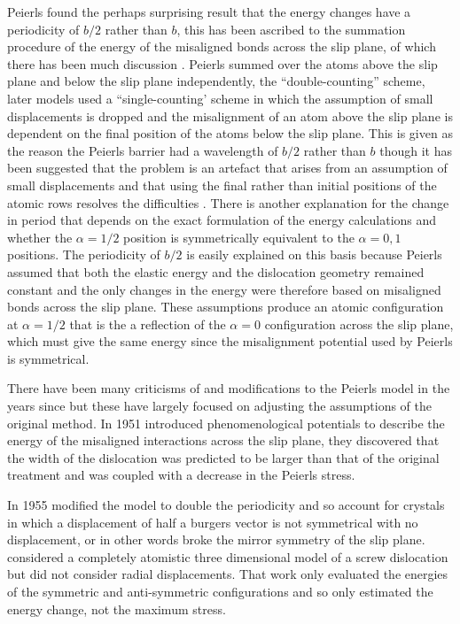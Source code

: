 Peierls found the perhaps surprising result that the energy changes have a periodicity of $b/2$ rather than $b$, this has been ascribed to the summation procedure of the energy of the misaligned bonds across the slip plane, of which there has been much discussion \cite{Hirth_Lothe1982lattice_periodicity,Lu2000peierls}. Peierls summed over the atoms above the slip plane and below the slip plane independently, the ``double-counting'' scheme, later models used a ``single-counting' scheme in which the assumption of small displacements is dropped and the misalignment of an atom above the slip plane is dependent on the final position of the atoms below the slip plane. This is given as the reason the Peierls barrier had a wavelength of $b/2$ rather than $b$ \cite{Hirth_Lothe1982lattice_periodicity,Lu2000peierls} though it has been suggested that the problem is an artefact that arises from an assumption of small displacements and that using the final rather than initial positions of the atomic rows resolves the difficulties \cite{Huntington1955}. There is another explanation for the change in period that depends on the exact formulation of the energy calculations and whether the $\alpha=1/2$ position is symmetrically equivalent to the $\alpha = 0, 1$ positions. The periodicity of $b/2$ is easily explained on this basis because Peierls assumed that both the elastic energy and the dislocation geometry remained constant and the only changes in the energy were therefore based on misaligned bonds across the slip plane. These assumptions produce an atomic configuration at $\alpha=1/2$ that is the a reflection  of the $\alpha=0$ configuration across the slip plane, which must give the same energy since the misalignment potential used by Peierls is symmetrical.




There have been many criticisms of and modifications to the Peierls model in the years since but these have largely focused on adjusting the assumptions of the original method.
In 1951 \citet{Foreman1951} introduced phenomenological potentials to describe the energy of the misaligned interactions across the slip plane, they discovered that the width of the dislocation was predicted to be larger than that of the original treatment and was coupled with a decrease in the Peierls stress.

In 1955 \citet{Huntington1955} modified the model to double the periodicity and so account for crystals in which a displacement of half a burgers vector is not symmetrical with no displacement, or in other words broke the mirror symmetry of the slip plane. 
\citet{Maradudin1959} considered a completely atomistic three dimensional model of a screw dislocation but did not consider radial displacements. That work only evaluated the energies of the symmetric and anti-symmetric configurations and so only estimated the energy change, not the maximum stress.



